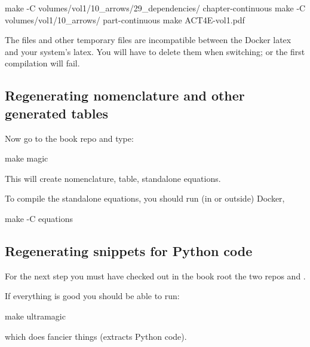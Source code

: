 \begin{console}
  make -C volumes/vol1/10_arrows/29_dependencies/ chapter-continuous
  make -C volumes/vol1/10_arrows/ part-continuous
  make ACT4E-vol1.pdf
\end{console}

\begin{remark}
  The  files and other temporary files are incompatible between the Docker latex and your system's latex. You will have to delete them when switching; or the first compilation will fail.
\end{remark}

\subsection{Regenerating nomenclature and other generated tables}



Now go to the book repo and type:

\begin{console}
  make magic
\end{console}

This will create nomenclature, table, standalone equations.

To compile the standalone equations, you should run (in or outside) Docker,

\begin{console}
  make -C equations
\end{console}

\subsection{Regenerating snippets for Python code}


For the next step you must have checked out in the book root the two repos
 and .


If everything is good you should be able to run:
\begin{console}
  make ultramagic
\end{console}
which does fancier things (extracts Python code).

